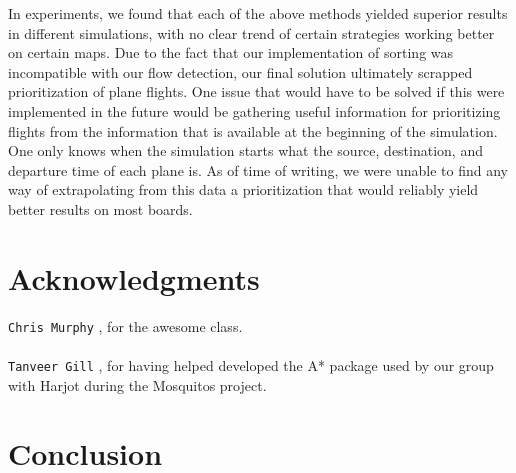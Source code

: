 \documentclass[10pt]{article}
\newcommand{\ms}[1] {
  \texttt{#1}
}
\begin{document}
In experiments, we found that each of the above methods yielded superior results in different
simulations, with no clear trend of certain strategies working better on certain maps. Due to the
fact that our implementation of sorting was incompatible with our flow detection, our final solution
ultimately scrapped prioritization of plane flights. One issue that would have to be solved if this
were implemented in the future would be gathering useful information for prioritizing flights from
the information that is available at the beginning of the simulation. One only knows when the simulation
starts what the source, destination, and departure time of each plane is. As of time of writing, we 
were unable to find any way of extrapolating from this data a prioritization that would reliably yield
better results on most boards.

\newpage
\section{Acknowledgments}

\ms{Chris Murphy}, for the awesome class.\\\\
\ms{Tanveer Gill}, for having helped developed the A* package used by our group with Harjot during
the Mosquitos project.

\newpage
\section{Conclusion}
  
\end{document}
